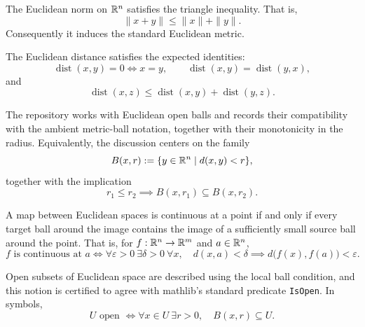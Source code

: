 \begin{proposition}\label{prop:norm-triangle-0-2}
\leanok
The Euclidean norm on $\mathbb{R}^n$ satisfies the triangle inequality.
That is,
\[
\|x+y\| \le \|x\|+\|y\|.
\]
Consequently it induces the standard Euclidean metric.
\end{proposition}

\begin{proposition}\label{prop:metric-identities-0-3}
\leanok
The Euclidean distance satisfies the expected identities:
\[
\operatorname{dist}(x,y)=0 \iff x=y,
\qquad
\operatorname{dist}(x,y)=\operatorname{dist}(y,x),
\]
and
\[
\operatorname{dist}(x,z) \le \operatorname{dist}(x,y)+\operatorname{dist}(y,z).
\]
\end{proposition}

\begin{definition}\label{def:euclidean-ball-0-4}
\leanok
The repository works with Euclidean open balls and records their compatibility with the ambient metric-ball notation, together with their monotonicity in the radius.
Equivalently, the discussion centers on the family
\[
B(x,r):=\{y\in\mathbb{R}^n \mid d(x,y)<r\},
\]
together with the implication
\[
r_1\le r_2 \implies B(x,r_1)\subseteq B(x,r_2).
\]
\end{definition}

\begin{proposition}\label{prop:continuous-ball-0-5}
\leanok
A map between Euclidean spaces is continuous at a point if and only if every target ball around the image contains the image of a sufficiently small source ball around the point.
That is, for $f : \mathbb{R}^n \to \mathbb{R}^m$ and $a\in\mathbb{R}^n$,
\[
f \text{ is continuous at } a
\iff
\forall \varepsilon>0\ \exists \delta>0\ \forall x,
\quad d(x,a)<\delta \implies d\bigl(f(x),f(a)\bigr)<\varepsilon.
\]
\end{proposition}

\begin{definition}\label{def:euclidean-open-0-6}
\leanok
Open subsets of Euclidean space are described using the local ball condition, and this notion is certified to agree with mathlib's standard predicate \texttt{IsOpen}.
In symbols,
\[
U \text{ open } \iff \forall x\in U\ \exists r>0,
\quad B(x,r)\subseteq U.
\]
\end{definition}

